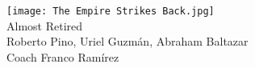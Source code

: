 \documentclass{article} %
\begin{document}
  

\pagestyle{empty}
  \begin{center}
    \strut %
    \texttt{[image: The Empire Strikes Back.jpg]} \\
    {\fontsize{60}{60}\selectfont Almost Retired\\}
    \vspace{0.5cm}
    {\Large Roberto Pino, Uriel Guzmán, Abraham Baltazar\\}
    {\Large Coach Franco Ramírez\\}
    \vfill
    \vspace{0.5cm}
    \vspace{1cm}
  \end{center}
\clearpage
\pagestyle{fancy}
  
\end{document}
